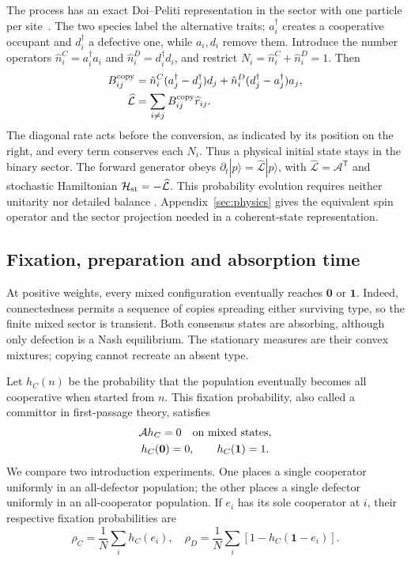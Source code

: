 \documentclass[aps,pre,reprint,amsmath,amssymb,longbibliography]{revtex4-2}
\newcommand{\one}{\bm 1}
\newcommand{\T}{\mathsf T}
\begin{document}
The process has an exact Doi--Peliti representation in the sector with
one particle per site~\cite{Doi1976SecondQuantization,Peliti1985PathIntegral}.
The two species label the alternative traits; $a_i^\dagger$ creates
a cooperative occupant and $d_i^\dagger$ a defective one, while
$a_i,d_i$ remove them. Introduce the number operators $\hat n_i^C=a_i^\dagger a_i$ and
$\hat n_i^D=d_i^\dagger d_i$, and restrict
$N_i=\hat n_i^C+\hat n_i^D=1$. Then
\begin{equation}
 \begin{aligned}
 B_{ij}^{\rm copy}&=\hat n_i^C(a_j^\dagger-d_j^\dagger)d_j
             +\hat n_i^D(d_j^\dagger-a_j^\dagger)a_j,\\
 \widehat{\mathcal L}&=\sum_{i\ne j}B_{ij}^{\rm copy}\widehat r_{ij}.
 \end{aligned}
 \label{eq:spin-generator}
\end{equation}
The diagonal rate acts before the conversion, as indicated by its
position on the right, and every term conserves each $N_i$.
Thus a physical initial state stays in the binary sector. The forward
generator obeys $\partial_t|p\rangle=\widehat{\mathcal L}|p\rangle$,
with $\widehat{\mathcal L}=\mathcal A^{\T}$ and stochastic Hamiltonian
$\mathcal H_{\rm st}=-\widehat{\mathcal L}$. This probability evolution
requires neither unitarity nor detailed balance
\cite{AlcarazEtAl1994,Schutz2001,DelRazoLammaMerbis2026}.
Appendix~\ref{sec:physics} gives the equivalent spin operator and the
sector projection needed in a coherent-state representation.

\subsection{Fixation, preparation and absorption time}
\label{sec:observables}
At positive weights, every mixed configuration eventually reaches
$\mathbf0$ or $\mathbf1$. Indeed, connectedness permits a sequence of
copies spreading either surviving type, so the finite mixed sector is
transient. Both consensus states are absorbing, although only defection
is a Nash equilibrium. The stationary measures are their convex
mixtures; copying cannot recreate an absent type.

Let $h_C(n)$ be the probability that the population eventually becomes
all cooperative when started from $n$. This fixation probability, also
called a committor in first-passage theory, satisfies
\begin{equation}
 \begin{gathered}
 \mathcal A h_C=0\quad\hbox{on mixed states},\\
 h_C(\mathbf0)=0,\qquad h_C(\mathbf1)=1.
 \end{gathered}
 \label{eq:committor}
\end{equation}
We compare two introduction experiments. One places a single cooperator
uniformly in an all-defector population; the other places a single
defector uniformly in an all-cooperator population. If $e_i$ has its
sole cooperator at $i$, their respective fixation probabilities are
\begin{equation}
 \rho_C=\frac1N\sum_i h_C(e_i),\quad
 \rho_D=\frac1N\sum_i[1-h_C(\one-e_i)].
 \label{eq:rho}
\end{equation}
\end{document}
